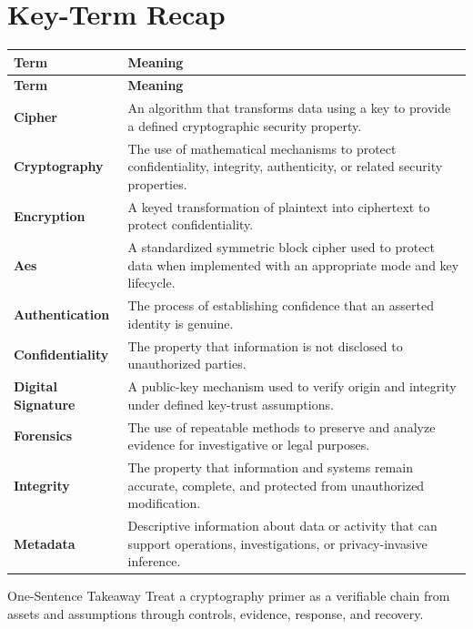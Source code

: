 \documentclass[11pt,letterpaper]{article}
\begin{document}
\section*{Key-Term Recap}
\begin{longtable}{>{\raggedright\arraybackslash}p{}>{\raggedright\arraybackslash}p{}}
\toprule\rowcolor{Navy}\color{white}\textbf{Term} & \color{white}\textbf{Meaning}\\\midrule
\endfirsthead
\toprule\rowcolor{Navy}\color{white}\textbf{Term} & \color{white}\textbf{Meaning}\\\midrule
\endhead
\textbf{Cipher} & An algorithm that transforms data using a key to provide a defined cryptographic security property. \\\midrule
\textbf{Cryptography} & The use of mathematical mechanisms to protect confidentiality, integrity, authenticity, or related security properties. \\\midrule
\textbf{Encryption} & A keyed transformation of plaintext into ciphertext to protect confidentiality. \\\midrule
\textbf{Aes} & A standardized symmetric block cipher used to protect data when implemented with an appropriate mode and key lifecycle. \\\midrule
\textbf{Authentication} & The process of establishing confidence that an asserted identity is genuine. \\\midrule
\textbf{Confidentiality} & The property that information is not disclosed to unauthorized parties. \\\midrule
\textbf{Digital Signature} & A public-key mechanism used to verify origin and integrity under defined key-trust assumptions. \\\midrule
\textbf{Forensics} & The use of repeatable methods to preserve and analyze evidence for investigative or legal purposes. \\\midrule
\textbf{Integrity} & The property that information and systems remain accurate, complete, and protected from unauthorized modification. \\\midrule
\textbf{Metadata} & Descriptive information about data or activity that can support operations, investigations, or privacy-invasive inference. \\\midrule
\bottomrule
\end{longtable}
\begin{CornellExamBox}{One-Sentence Takeaway}
Treat a cryptography primer as a verifiable chain from assets and assumptions through controls, evidence, response, and recovery.
\end{CornellExamBox}
\end{document}
